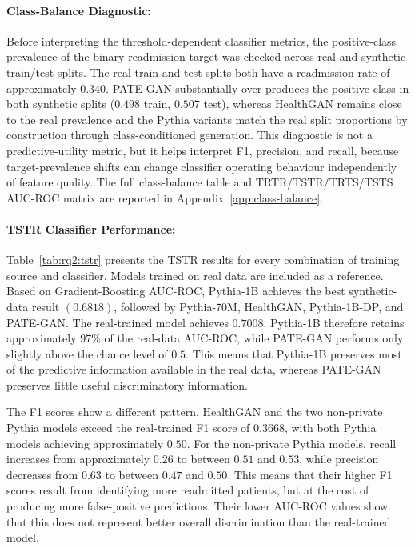 \paragraph{Class-Balance Diagnostic:}
Before interpreting the threshold-dependent classifier metrics, the
positive-class prevalence of the binary readmission target was checked
across real and synthetic train/test splits. The real train and test splits
both have a readmission rate of approximately $0.340$. PATE-GAN
substantially over-produces the positive class in both synthetic splits
($0.498$ train, $0.507$ test), whereas HealthGAN remains close to the real
prevalence and the Pythia variants match the real split proportions by
construction through class-conditioned generation. This diagnostic is not a
predictive-utility metric, but it helps interpret F1, precision, and recall,
because target-prevalence shifts can change classifier operating behaviour
independently of feature quality. The full class-balance table and
TRTR/TSTR/TRTS/TSTS AUC-ROC matrix are reported in
Appendix~\ref{app:class-balance}.

\paragraph{TSTR Classifier Performance:}
Table~\ref{tab:rq2:tstr} presents the TSTR results for every combination
of training source and classifier. Models trained on real data are
included as a reference. Based on Gradient-Boosting AUC-ROC, Pythia-1B
achieves the best synthetic-data result $(0.6818)$, followed by
Pythia-70M, HealthGAN, Pythia-1B-DP,
and PATE-GAN. The real-trained model achieves $0.7008$.
Pythia-1B therefore retains approximately $97\%$ of the real-data
AUC-ROC, while PATE-GAN performs only slightly above the chance level
of $0.5$. This means that Pythia-1B preserves most of the predictive
information available in the real data, whereas PATE-GAN preserves
little useful discriminatory information.

\begin{table}[H]
\centering
\small
\caption{Train-on-Synthetic, Test-on-Real (TSTR) utility for all five
generators and the Train-on-Real (TRTR) reference, evaluated on the real
held-out split ($n = 14{,}304$) with \emph{readmitted} as the target.
The highest synthetic Gradient-Boosting AUC-ROC is shown in bold.}
\label{tab:rq2:tstr}

\end{table}

The F1 scores show a different pattern. HealthGAN and the two
non-private Pythia models exceed the real-trained F1 score of $0.3668$,
with both Pythia models achieving approximately $0.50$. For the
non-private Pythia models, recall increases from approximately $0.26$
to between $0.51$ and $0.53$, while precision decreases from $0.63$
to between $0.47$ and $0.50$. This means that their higher F1 scores
result from identifying more readmitted patients, but at the cost of
producing more false-positive predictions. Their lower AUC-ROC values
show that this does not represent better overall discrimination than
the real-trained model.

